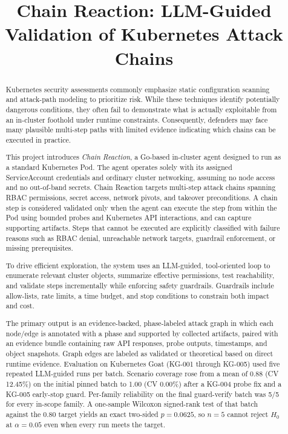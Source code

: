 \documentclass[conference]{IEEEtran}
\title{Chain Reaction: LLM-Guided Validation of Kubernetes Attack Chains}
\author{
\IEEEauthorblockN{Ashwin Charathsandran}
\IEEEauthorblockA{
FSCT-8611 Graduation Project\\
British Columbia Institute of Technology (BCIT)\\
Vancouver, BC, Canada\\
acharathsandran1@my.bcit.ca
}
}
\begin{document}
\maketitle

\begin{abstract}
Kubernetes security assessments commonly emphasize static configuration scanning and attack-path modeling to prioritize risk. While these techniques identify potentially dangerous conditions, they often fail to demonstrate what is actually exploitable from an in-cluster foothold under runtime constraints. Consequently, defenders may face many plausible multi-step paths with limited evidence indicating which chains can be executed in practice.

This project introduces \emph{Chain Reaction}, a Go-based in-cluster agent designed to run as a standard Kubernetes Pod. The agent operates solely with its assigned ServiceAccount credentials and ordinary cluster networking, assuming no node access and no out-of-band secrets. Chain Reaction targets multi-step attack chains spanning RBAC permissions, secret access, network pivots, and takeover preconditions. A chain step is considered validated only when the agent can execute the step from within the Pod using bounded probes and Kubernetes API interactions, and can capture supporting artifacts. Steps that cannot be executed are explicitly classified with failure reasons such as RBAC denial, unreachable network targets, guardrail enforcement, or missing prerequisites.

To drive efficient exploration, the system uses an LLM-guided, tool-oriented loop to enumerate relevant cluster objects, summarize effective permissions, test reachability, and validate steps incrementally while enforcing safety guardrails. Guardrails include allow-lists, rate limits, a time budget, and stop conditions to constrain both impact and cost.

The primary output is an evidence-backed, phase-labeled attack graph in which each node/edge is annotated with a phase and supported by collected artifacts, paired with an evidence bundle containing raw API responses, probe outputs, timestamps, and object snapshots. Graph edges are labeled as validated or theoretical based on direct runtime evidence. Evaluation on Kubernetes Goat (KG-001 through KG-005) used five repeated LLM-guided runs per batch. Scenario coverage rose from a mean of 0.88 (CV 12.45\%) on the initial pinned batch to 1.00 (CV 0.00\%) after a KG-004 probe fix and a KG-005 early-stop guard. Per-family reliability on the final guard-verify batch was 5/5 for every in-scope family. A one-sample Wilcoxon signed-rank test of that batch against the 0.80 target yields an exact two-sided $p=0.0625$, so $n=5$ cannot reject $H_0$ at $\alpha=0.05$ even when every run meets the target.
\end{abstract}
\end{document}
